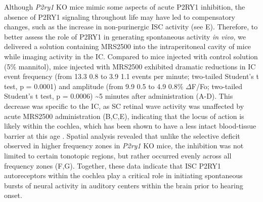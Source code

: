 \documentclass[9pt,lineno]{elife}
\begin{document}
Although \textit{P2ry1} KO mice mimic some aspects of acute P2RY1 inhibition, the absence of P2RY1 signaling throughout life may have led to compensatory changes, such as the increase in non-purinergic ISC activity (see E). Therefore, to better assess the role of P2RY1 in generating spontaneous activity \textit{in vivo}, we delivered a solution containing MRS2500 into the intraperitoneal cavity of mice while imaging activity in the IC. Compared to mice injected with control solution (5\% mannitol), mice injected with MRS2500 exhibited dramatic reductions in IC event frequency (from 13.3 \textpm \hspace{0.2 mm} 0.8 to 3.9 \textpm \hspace{0.2 mm} 1.1 events per minute; two-tailed Student’s t test, p = 0.0001) and amplitude (from 9.9 \textpm \hspace{0.2 mm} 0.5 to 4.9 \textpm \hspace{0.2 mm} 0.8\% $\Delta$F/Fo; two-tailed Student’s t test, p = 0.0006) \textasciitilde 5 minutes after administration (A-D). This decrease was specific to the IC, as SC retinal wave activity \citep{Ackman2012} was unaffected by acute MRS2500 administration (B,C,E), indicating that the locus of action is likely within the cochlea, which has been shown to have a less intact blood-tissue barrier at this age \citep{Suzuki1998}. Spatial analysis revealed that unlike the selective deficit observed in higher frequency zones in \textit{P2ry1} KO mice, the inhibition was not limited to certain tonotopic regions, but rather occurred evenly across all frequency zones (F,G). Together, these data indicate that ISC P2RY1 autoreceptors within the cochlea play a critical role in initiating spontaneous bursts of neural activity in auditory centers within the brain prior to hearing onset.
\end{document}

